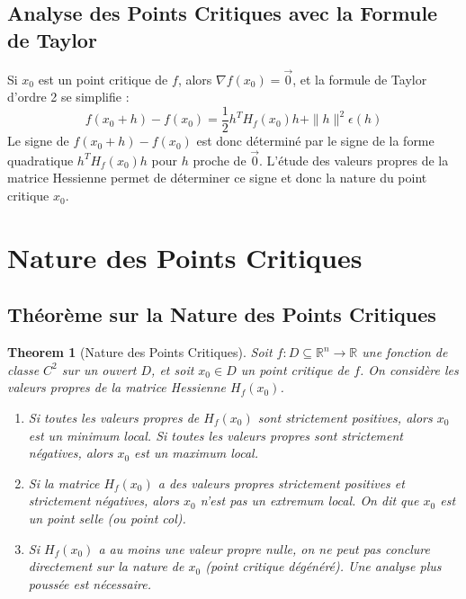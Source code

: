 \documentclass{article}
\newtheorem{theorem}{Theorem}
\begin{document}
\subsection{Analyse des Points Critiques avec la Formule de Taylor}
Si $x_0$ est un point critique de $f$, alors $\nabla f(x_0) = \vec{0}$, et la formule de Taylor d'ordre 2 se simplifie :
\[ f(x_0 + h) - f(x_0) = \frac{1}{2} h^T H_f(x_0) h + \|h\|^2 \epsilon(h) \]
Le signe de $f(x_0 + h) - f(x_0)$ est donc déterminé par le signe de la forme quadratique $h^T H_f(x_0) h$ pour $h$ proche de $\vec{0}$. L'étude des valeurs propres de la matrice Hessienne permet de déterminer ce signe et donc la nature du point critique $x_0$.

\section{Nature des Points Critiques}

\subsection{Théorème sur la Nature des Points Critiques}

\begin{theorem}[Nature des Points Critiques]
Soit $f: D \subseteq \mathbb{R}^n \rightarrow \mathbb{R}$ une fonction de classe $C^2$ sur un ouvert $D$, et soit $x_0 \in D$ un point critique de $f$. On considère les valeurs propres de la matrice Hessienne $H_f(x_0)$.
\begin{enumerate}
    \item Si toutes les valeurs propres de $H_f(x_0)$ sont strictement positives, alors $x_0$ est un minimum local. Si toutes les valeurs propres sont strictement négatives, alors $x_0$ est un maximum local.
    \item Si la matrice $H_f(x_0)$ a des valeurs propres strictement positives et strictement négatives, alors $x_0$ n'est pas un extremum local. On dit que $x_0$ est un point selle (ou point col).
    \item Si $H_f(x_0)$ a au moins une valeur propre nulle, on ne peut pas conclure directement sur la nature de $x_0$ (point critique dégénéré). Une analyse plus poussée est nécessaire.
\end{enumerate}
\end{theorem}
\end{document}
